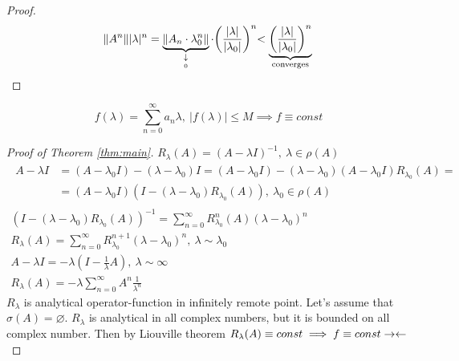 \begin{proof}\leavevmode
  \begin{equation*}
      \|A^n\| |\lambda|^n = \underbrace{\|A_n \cdot \lambda_0^n\|}_{\underset{0}{\downarrow}} \cdot
      \biggl( \frac{|\lambda|}{|\lambda_0|} \biggl)^n < \underbrace{\biggl(
      \frac{|\lambda|}{|\lambda_0|} \biggl)^n}_{\text{converges}} \qedhere
  \end{equation*}
\end{proof}

\begin{thm}[Liouville]
  \[
    f(\lambda) = \sum_{n = 0}^\infty a_n \lambda,\ 
    |f(\lambda)| \leq M \implies f \equiv const
  \]
\end{thm}

\begin{proof}[Proof of Theorem \ref{thm:main}]
  $R_\lambda(A) = (A - \lambda I)^{-1},\ \lambda \in \rho(A)$
  \begin{gather*}
    \begin{split}
      A - \lambda I & = (A - \lambda_0 I) - (\lambda - \lambda_0) I = (A - \lambda_0 I) - (\lambda - \lambda_0) (A - \lambda_0 I) R_{\lambda_0}(A) = {}\\
                    & = (A - \lambda_0 I)(I - (\lambda - \lambda_0)R_{\lambda_0}(A)),\ \lambda_0 \in \rho(A) 
    \end{split} \\
    (I - (\lambda - \lambda_0) R_{\lambda_0}(A))^{-1} = \sum_{n=0}^\infty R_{\lambda_0}^n(A)(\lambda - \lambda_0)^n \\
    R_\lambda(A)  = \sum_{n=0}^\infty R_{\lambda_0}^{n + 1} (\lambda - \lambda_0)^n,\ \lambda \sim \lambda_0 \\
    A - \lambda I = -\lambda(I - \tfrac 1\lambda A),\ \lambda \sim \infty \\
    R_\lambda(A)  = -\lambda \sum_{n = 0}^\infty A^n \frac{1}{\lambda^n}
  \end{gather*}
  $R_\lambda$ is analytical operator-function in infinitely remote point.
  Let's assume that $\sigma(A) = \varnothing$. 
  $R_\lambda$ is analytical in all complex numbers, but it is bounded on all
  complex number. Then by Liouville theorem $R_\lambda(A) \equiv const \implies
  f \equiv const \rightarrow\leftarrow$
\end{proof}

